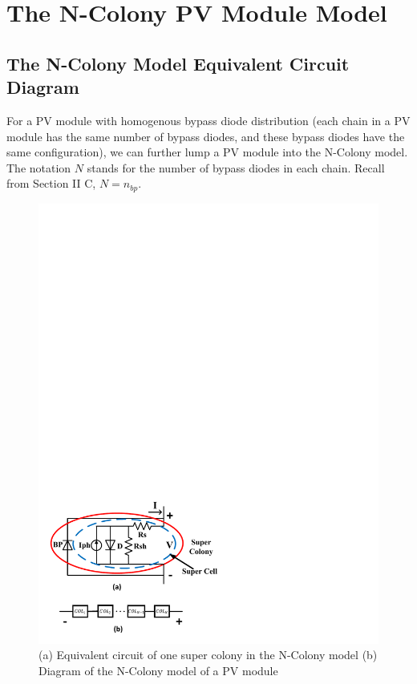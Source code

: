 \section{The N-Colony PV Module Model}
\subsection{The N-Colony Model Equivalent Circuit Diagram}
For a PV module with homogenous bypass diode distribution (each chain in a PV module has the same number of bypass diodes, and these bypass diodes have the same configuration), we can further lump a PV module into the N-Colony model. The notation $N$ stands for the number of bypass diodes in each chain. Recall from Section II C, $N = n_{bp}$.

\begin{figure}[tb]
    \centering
    \includegraphics[width=1\columnwidth]{figs/nc_model_diagram.pdf}
    \caption{(a) Equivalent circuit of one super colony in the N-Colony model (b) Diagram of the N-Colony model of a PV module}
    \label{fig:ncDiagram}
\end{figure}

